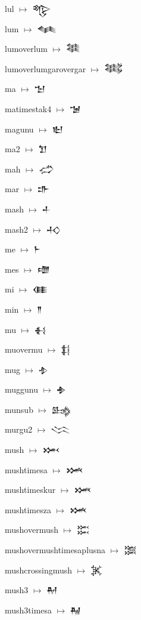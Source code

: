 {\noindent lul $\mapsto$ {\cufont 𒈜}\par
\noindent lum $\mapsto$ {\cufont 𒈝}\par
\noindent lumoverlum $\mapsto$ {\cufont 𒈞}\par
\noindent lumoverlumgarovergar $\mapsto$ {\cufont 𒈟}\par
\noindent ma $\mapsto$ {\cufont 𒈠}\par
\noindent matimestak4 $\mapsto$ {\cufont 𒈡}\par
\noindent magunu $\mapsto$ {\cufont 𒈢}\par
\noindent ma2 $\mapsto$ {\cufont 𒈣}\par
\noindent mah $\mapsto$ {\cufont 𒈤}\par
\noindent mar $\mapsto$ {\cufont 𒈥}\par
\noindent mash $\mapsto$ {\cufont 𒈦}\par
\noindent mash2 $\mapsto$ {\cufont 𒈧}\par
\noindent me $\mapsto$ {\cufont 𒈨}\par
\noindent mes $\mapsto$ {\cufont 𒈩}\par
\noindent mi $\mapsto$ {\cufont 𒈪}\par
\noindent min $\mapsto$ {\cufont 𒈫}\par
\noindent mu $\mapsto$ {\cufont 𒈬}\par
\noindent muovermu $\mapsto$ {\cufont 𒈭}\par
\noindent mug $\mapsto$ {\cufont 𒈮}\par
\noindent muggunu $\mapsto$ {\cufont 𒈯}\par
\noindent munsub $\mapsto$ {\cufont 𒈰}\par
\noindent murgu2 $\mapsto$ {\cufont 𒈱}\par
\noindent mush $\mapsto$ {\cufont 𒈲}\par
\noindent mushtimesa $\mapsto$ {\cufont 𒈳}\par
\noindent mushtimeskur $\mapsto$ {\cufont 𒈴}\par
\noindent mushtimesza $\mapsto$ {\cufont 𒈵}\par
\noindent mushovermush $\mapsto$ {\cufont 𒈶}\par
\noindent mushovermushtimesaplusna $\mapsto$ {\cufont 𒈷}\par
\noindent mushcrossingmush $\mapsto$ {\cufont 𒈸}\par
\noindent mush3 $\mapsto$ {\cufont 𒈹}\par
\noindent mush3timesa $\mapsto$ {\cufont 𒈺}\par
}
